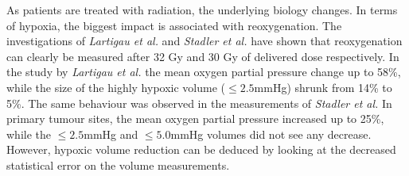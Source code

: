As patients are treated with radiation, the underlying biology changes. In terms of hypoxia, the biggest impact is associated with reoxygenation. The investigations of \textit{Lartigau et al.}\cite{pmid9797698} and \textit{Stadler et al.}\cite{pmid9783887} have shown that reoxygenation can clearly be measured after 32 Gy and 30 Gy of delivered dose respectively. In the study by \textit{Lartigau et al.} the mean oxygen partial pressure change up to 58\%, while the size of the highly hypoxic volume ($\leq 2.5$mmHg) shrunk from 14\% to 5\%. The same behaviour was observed in the measurements of \textit{Stadler et al.} In primary tumour sites, the mean oxygen partial pressure increased up to 25\%, while the $\leq 2.5$mmHg and $\leq 5.0$mmHg volumes did not see any decrease. However, hypoxic volume reduction can be deduced by looking at the decreased statistical error on the volume measurements. 

